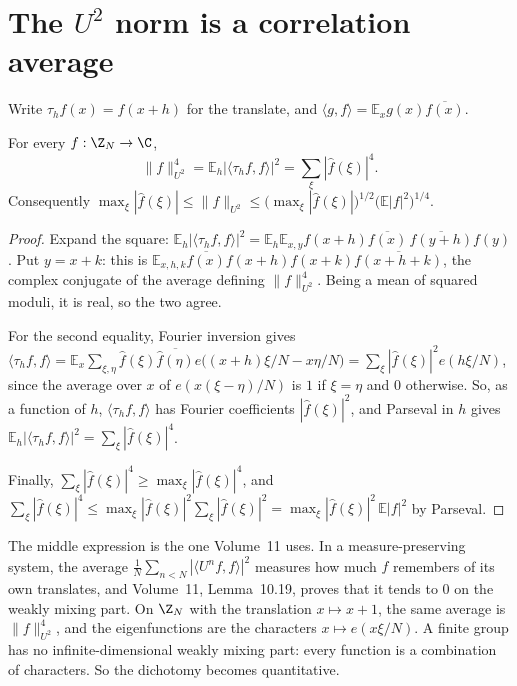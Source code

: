 \section{The $U^2$ norm is a correlation average}\label{sec:u2corr}

Write $\tau_hf(x)=f(x+h)$ for the translate, and $\langle g,f\rangle=\mathbb E_xg(x)\overline{f(x)}$.

\begin{proposition}\label{prop:u2corr}
For every $f:\Z_N\to\C$,
\[
\|f\|_{U^2}^4=\mathbb E_h\bigl|\langle\tau_hf,f\rangle\bigr|^2=\sum_\xi|\hat f(\xi)|^4.
\]
Consequently $\max_\xi|\hat f(\xi)|\le\|f\|_{U^2}\le\bigl(\max_\xi|\hat f(\xi)|\bigr)^{1/2}\bigl(\mathbb E|f|^2\bigr)^{1/4}$.
\end{proposition}
\begin{proof}
Expand the square: $\mathbb E_h|\langle\tau_hf,f\rangle|^2=\mathbb E_h\mathbb E_{x,y}f(x+h)\overline{f(x)}\,\overline{f(y+h)}f(y)$. Put $y=x+k$: this is $\mathbb E_{x,h,k}\overline{f(x)}f(x+h)f(x+k)\overline{f(x+h+k)}$, the complex conjugate of the average defining $\|f\|_{U^2}^4$. Being a mean of squared moduli, it is real, so the two agree.

For the second equality, Fourier inversion gives $\langle\tau_hf,f\rangle=\mathbb E_x\sum_{\xi,\eta}\hat f(\xi)\overline{\hat f(\eta)}e\bigl((x+h)\xi/N-x\eta/N\bigr)=\sum_\xi|\hat f(\xi)|^2e(h\xi/N)$, since the average over $x$ of $e(x(\xi-\eta)/N)$ is $1$ if $\xi=\eta$ and $0$ otherwise. So, as a function of $h$, $\langle\tau_hf,f\rangle$ has Fourier coefficients $|\hat f(\xi)|^2$, and Parseval in $h$ gives $\mathbb E_h|\langle\tau_hf,f\rangle|^2=\sum_\xi|\hat f(\xi)|^4$.

Finally, $\sum_\xi|\hat f(\xi)|^4\ge\max_\xi|\hat f(\xi)|^4$, and $\sum_\xi|\hat f(\xi)|^4\le\max_\xi|\hat f(\xi)|^2\sum_\xi|\hat f(\xi)|^2=\max_\xi|\hat f(\xi)|^2\,\mathbb E|f|^2$ by Parseval.
\end{proof}

The middle expression is the one Volume~11 uses. In a measure-preserving system, the average $\frac1N\sum_{n<N}|\langle U^nf,f\rangle|^2$ measures how much $f$ remembers of its own translates, and Volume~11, Lemma~10.19, proves that it tends to $0$ on the weakly mixing part. On $\Z_N$ with the translation $x\mapsto x+1$, the same average is $\|f\|_{U^2}^4$, and the eigenfunctions are the characters $x\mapsto e(x\xi/N)$. A finite group has no infinite-dimensional weakly mixing part: every function is a combination of characters. So the dichotomy becomes quantitative.

